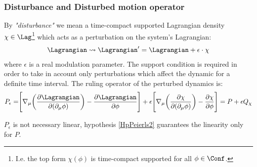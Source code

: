 \documentclass[Main]{subfiles}
\begin{document}
	\subsubsection{Disturbance and Disturbed motion operator }
		By \emph{"disturbance"} we mean a time-compact supported Lagrangian density $\chi \in \Lag$\footnote{I.e. the top form $\chi(\phi)$ is time-compact supported for all $\phi \in \Conf$.} which acts as a perturbation on the system's Lagrangian:
		\begin{displaymath}
			\Lagrangian \rightsquigarrow \Lagrangian' = \Lagrangian + \epsilon\cdot \chi
		\end{displaymath}
		where $\epsilon$  is a real modulation parameter.
		The support condition is required in order to take in account only perturbations which affect the dynamic for a definite time interval.
		The ruling operator of the perturbed dynamics is:
		\begin{equation}
			P_\epsilon = \Biggr[ \nabla_\mu \biggr( \frac{\partial \Lagrangian}{\partial(\partial_\mu \phi)} \biggr) - \frac{\partial \Lagrangian}{\partial \phi} \Biggr] + \epsilon \Biggr[ \nabla_\mu \biggr( \frac{\partial \chi}{\partial(\partial_\mu \phi)} \biggr) - \frac{\partial \chi}{\partial \phi} \Biggr]
			= P + \epsilon Q_\chi		
		\end{equation}
		\begin{remark}
			$P_\epsilon$ is not necessary linear, hypothesis \ref{HpPeierls2} guarantees the linearity only for $P$.
		\end{remark}
\end{document}
